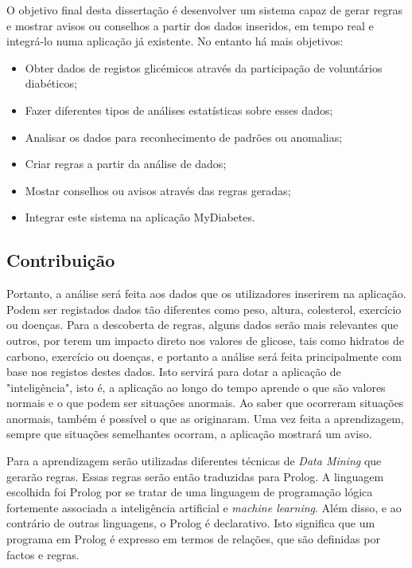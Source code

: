 O objetivo final desta dissertação é desenvolver um sistema capaz de gerar regras e mostrar avisos ou conselhos a partir dos dados inseridos, em tempo real e integrá-lo numa aplicação já existente. No entanto há mais objetivos:

\begin{itemize}
	\item Obter dados de registos glicémicos através da participação de voluntários diabéticos;
	\item Fazer diferentes tipos de análises estatísticas sobre esses dados;
	\item Analisar os dados para reconhecimento de padrões ou anomalias;
	\item Criar regras a partir da análise de dados;
	\item Mostar conselhos ou avisos através das regras geradas;
	\item Integrar este sistema na aplicação MyDiabetes.
\end{itemize}

\subsection{Contribuição}





Portanto, a análise será feita aos dados que os utilizadores inserirem na aplicação. Podem ser registados dados tão diferentes como peso, altura, colesterol, exercício ou doenças. Para a descoberta de regras, alguns dados serão mais relevantes que outros, por terem um impacto direto nos valores de glicose, tais como hidratos de carbono, exercício ou doenças, e portanto a análise será feita principalmente com base nos registos destes dados. Isto servirá para dotar a aplicação de "inteligência", isto é, a aplicação ao longo do tempo aprende o que são valores normais e o que podem ser situações anormais. Ao saber que ocorreram situações anormais, também é possível o que as originaram. Uma vez feita a aprendizagem, sempre que situações semelhantes ocorram, a aplicação mostrará um aviso.

Para a aprendizagem serão utilizadas diferentes técnicas de \textit{Data Mining} que gerarão regras. Essas regras serão então traduzidas para Prolog. A linguagem escolhida foi Prolog por se tratar de uma linguagem de programação lógica fortemente associada a inteligência artificial e \textit{machine learning}. Além disso, e ao contrário de outras linguagens, o Prolog é declarativo. Isto significa que um programa em Prolog é expresso em termos de relações, que são definidas por factos e regras.


